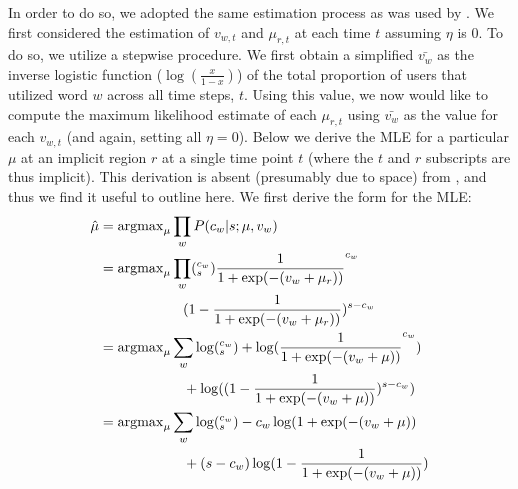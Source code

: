 In order to do so, we adopted the same estimation process as was used by \cite{eisenstein_diffusion_2014}. We first considered the estimation of $v_{w,t}$ and $\mu_{r,t}$ at each time $t$ assuming $\eta$ is 0.  To do so, we utilize a stepwise procedure.  We first obtain a simplified $\bar{v_w}$ as the inverse logistic function ($\log(\frac{x}{1-x})$) of the total proportion of users that utilized word $w$ across all time steps, $t$. Using this value, we now would like to compute the maximum likelihood estimate of each $\mu_{r,t}$ using $\bar{v_w}$ as the value for each $v_{w,t}$ (and again, setting all $\eta = 0$).   Below we derive the MLE for a particular $\mu$ at an implicit region $r$ at a single time point $t$ (where the $t$ and $r$ subscripts are thus implicit). This derivation is  absent (presumably due to space) from \cite{eisenstein_diffusion_2014}, and thus we find it useful to outline here.  We first derive the form for the MLE:
\begin{align}
\small
\begin{split}
  \hat{\mu} &= \mathrm{argmax}_{\mu} \prod_w P(c_w | s; \mu, v_w) \\
  &= \mathrm{argmax}_{\mu} \prod_w   ({}^{c_w}_{s}) \frac{1}{1+\exp(-(v_w+\mu_r))}^{c_w}\\ &\qquad \qquad \qquad (1- \frac{1}{ 1+\exp(-(v_w+\mu_r))})^{s-c_w} \\
  &= \mathrm{argmax}_{\mu} \sum_w \log({}^{c_w}_{s})  + \log(\frac{1}{1+ \exp(-(v_w+\mu))}^{c_w}) \\ &\qquad \qquad \qquad + \log( (1- \frac{1}{ 1+ \exp(-(v_w+\mu))})^{s-c_w}) \\
  &= \mathrm{argmax}_{\mu}  \sum_w \log({}^{c_w}_{s})  - c_w \log(1+ \exp(-(v_w+\mu)) \\ &\qquad \qquad \qquad + (s-c_w) \log (1- \frac{1}{ 1+ \exp(-(v_w+\mu))})
  \end{split}
\end{align}

